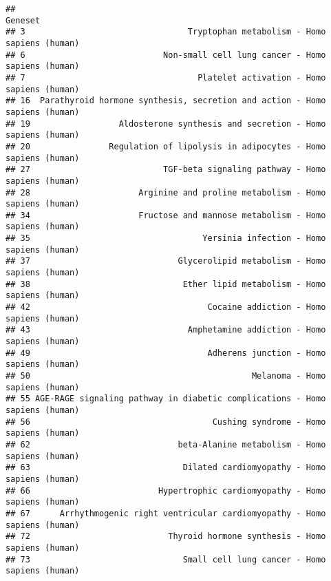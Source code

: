 \documentclass[
]{article}
\newenvironment{Shaded}{\begin{snugshade}}{\end{snugshade}}
\newcommand{\DecValTok}[1]{\textcolor[rgb]{0.00,0.00,0.81}{#1}}
\newcommand{\FloatTok}[1]{\textcolor[rgb]{0.00,0.00,0.81}{#1}}
\newcommand{\FunctionTok}[1]{\textcolor[rgb]{0.00,0.00,0.00}{#1}}
\newcommand{\NormalTok}[1]{#1}
\newcommand{\SpecialCharTok}[1]{\textcolor[rgb]{0.00,0.00,0.00}{#1}}
\begin{document}
\begin{Shaded}
\end{Shaded}

\begin{verbatim}
##                                                                        Geneset
## 3                                 Tryptophan metabolism - Homo sapiens (human)
## 6                            Non-small cell lung cancer - Homo sapiens (human)
## 7                                   Platelet activation - Homo sapiens (human)
## 16  Parathyroid hormone synthesis, secretion and action - Homo sapiens (human)
## 19                  Aldosterone synthesis and secretion - Homo sapiens (human)
## 20                Regulation of lipolysis in adipocytes - Homo sapiens (human)
## 27                           TGF-beta signaling pathway - Homo sapiens (human)
## 28                      Arginine and proline metabolism - Homo sapiens (human)
## 34                      Fructose and mannose metabolism - Homo sapiens (human)
## 35                                   Yersinia infection - Homo sapiens (human)
## 37                              Glycerolipid metabolism - Homo sapiens (human)
## 38                               Ether lipid metabolism - Homo sapiens (human)
## 42                                    Cocaine addiction - Homo sapiens (human)
## 43                                Amphetamine addiction - Homo sapiens (human)
## 49                                    Adherens junction - Homo sapiens (human)
## 50                                             Melanoma - Homo sapiens (human)
## 55 AGE-RAGE signaling pathway in diabetic complications - Homo sapiens (human)
## 56                                     Cushing syndrome - Homo sapiens (human)
## 62                              beta-Alanine metabolism - Homo sapiens (human)
## 63                               Dilated cardiomyopathy - Homo sapiens (human)
## 66                          Hypertrophic cardiomyopathy - Homo sapiens (human)
## 67      Arrhythmogenic right ventricular cardiomyopathy - Homo sapiens (human)
## 72                            Thyroid hormone synthesis - Homo sapiens (human)
## 73                               Small cell lung cancer - Homo sapiens (human)

\end{verbatim}
\end{document}
